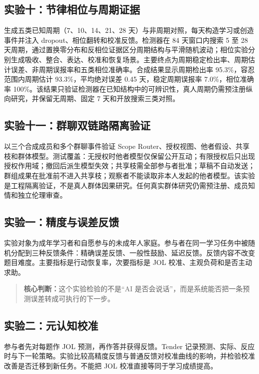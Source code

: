 \documentclass[UTF8,a4paper,11pt]{ctexart}
\newcommand{\keypoint}[1]{\begin{quote}\noindent\textbf{\color{TenderBlue}核心判断：}#1\end{quote}}
\begin{document}
\subsection{实验十：节律相位与周期证据}

生成五类已知周期（7、10、14、21、28 天）与非周期对照，每天构造学习或创造事件并注入 dropout、相位翻转和校准反馈。检测器在 84 天窗口内搜索 5 至 28 天周期，通过置换零分布和反相位证据区分周期结构与平滑随机波动；相位实验分别生成吸收、整合、表达、校准和恢复场景。主要终点为周期稳定检出率、周期估计误差、非周期误报率和五类相位准确率。合成结果显示周期检出率 95.3\%，容忍范围内周期估计 93.3\%，平均绝对误差 0.45 天，稳定周期误报率 7.0\%，相位准确率 100\%。该结果只验证检测器在已知结构中的可辨识性，真人周期仍需预注册纵向研究，并保留无周期、固定 7 天和开放搜索三类对照。

\subsection{实验十一：群聊双链路隔离验证}

以三个合成成员和多个群聊事件验证 Scope Router、授权视图、他者假设、共享枝和群体模型。测试覆盖：无授权时他者模型仅保留公开互动；有限授权后只出现授权作用域；撤回后派生模型失效；共享枝需全部参与者批准；草稿不自动发送；群组成果在批准前不进入共享枝；观察者不能读取非本人发起的他者模型。该实验是工程隔离验证，不是真人群体因果研究。任何真实群体研究仍需预注册、成员知情和独立伦理审查。

\subsection{实验一：精度与误差反馈}

实验对象为成年学习者和自愿参与的未成年人家庭。参与者在同一学习任务中被随机分配到三种反馈条件：精确误差反馈、一般性鼓励、延迟反馈。反馈内容不改变题目难度。主要指标是行动恢复率，次要指标是 JOL 校准、主观负荷和是否主动求助。

\keypoint{这个实验检验的不是“AI 是否会说话”，而是系统能否把一条预测误差转成可执行的下一步。}

\subsection{实验二：元认知校准}

参与者先对每题作 JOL 预测，再作答并获得反馈。Tender 记录预测、实际、反应时与下一轮策略。实验比较高精度反馈与普通反馈对校准曲线的影响，并检验校准改善是否迁移到新任务。不能把 JOL 校准直接等同于学习成绩提高。
\end{document}
